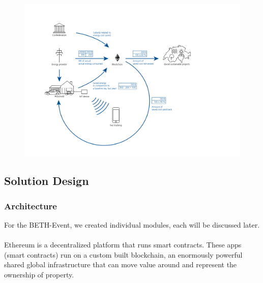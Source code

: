 \documentclass[11pt]{article}
\begin{document}
\begin{figure}[ht]
	\centering
	\includegraphics[width=1\linewidth]{concept.png}
\end{figure}





\subsection{Solution Design}
\subsubsection{Architecture}
For the BETH-Event, we created individual modules, each will be discussed later.\\\\
Ethereum is a decentralized platform that runs smart contracts. These apps (smart contracts) run on a custom built blockchain, an enormously powerful shared global infrastructure that can move value around and represent the ownership of property.\cite{23}
\end{document}
